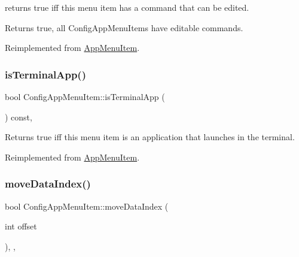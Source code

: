 returns true iff this menu item has a command that can be edited. \begin{DoxyReturn}{Returns}
true, all Config\+App\+Menu\+Items have editable commands. 
\end{DoxyReturn}


Reimplemented from \mbox{\hyperlink{classAppMenuItem_a295fde428e713a8c891dc19b5048c373}{App\+Menu\+Item}}.

\mbox{\label{classConfigAppMenuItem_ae986dacefb0b3fb79917452b4857d6ec}} 
\subsubsection{\texorpdfstring{is\+Terminal\+App()}{isTerminalApp()}}
{\footnotesize\ttfamily bool Config\+App\+Menu\+Item\+::is\+Terminal\+App (\begin{DoxyParamCaption}{ }\end{DoxyParamCaption}) const\hspace{0.3cm}{\ttfamily [override]}, {\ttfamily [virtual]}}

\begin{DoxyReturn}{Returns}
true iff this menu item is an application that launches in the terminal. 
\end{DoxyReturn}


Reimplemented from \mbox{\hyperlink{classAppMenuItem_ac8e0c435f1e5dcf67dff223d819f6a2d}{App\+Menu\+Item}}.

\mbox{\label{classConfigAppMenuItem_a3429460996f3d912566ab0a6c901bc11}} 
\subsubsection{\texorpdfstring{move\+Data\+Index()}{moveDataIndex()}}
{\footnotesize\ttfamily bool Config\+App\+Menu\+Item\+::move\+Data\+Index (\begin{DoxyParamCaption}\item[{int}]{offset }\end{DoxyParamCaption})\hspace{0.3cm}{\ttfamily [override]}, {\ttfamily [protected]}, {\ttfamily [virtual]}}

